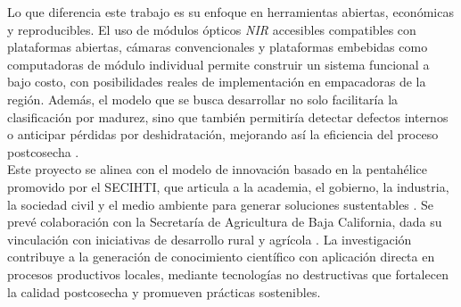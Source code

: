 Lo que diferencia este trabajo es su enfoque en herramientas abiertas, económicas y reproducibles. El uso de módulos ópticos \textit{NIR} accesibles compatibles con plataformas abiertas, cámaras convencionales y plataformas embebidas como computadoras de módulo individual permite construir un sistema funcional a bajo costo, con posibilidades reales de implementación en empacadoras de la región. Además, el modelo que se busca desarrollar no solo facilitaría la clasificación por madurez, sino que también permitiría detectar defectos internos o anticipar pérdidas por deshidratación, mejorando así la eficiencia del proceso postcosecha \parencite{wang_improving_2025,passos_deep_2023}.\\

Este proyecto se alinea con el modelo de innovación basado en la pentahélice promovido por el SECIHTI, que articula a la academia, el gobierno, la industria, la sociedad civil y el medio ambiente para generar soluciones sustentables \parencite{secihti_plan_2023}. Se prevé colaboración con la Secretaría de Agricultura de Baja California, dada su vinculación con iniciativas de desarrollo rural y agrícola \parencite{gobierno_de_baja_california_secretariagricultura_2025}. La investigación contribuye a la generación de conocimiento científico con aplicación directa en procesos productivos locales, mediante tecnologías no destructivas que fortalecen la calidad postcosecha y promueven prácticas sostenibles.